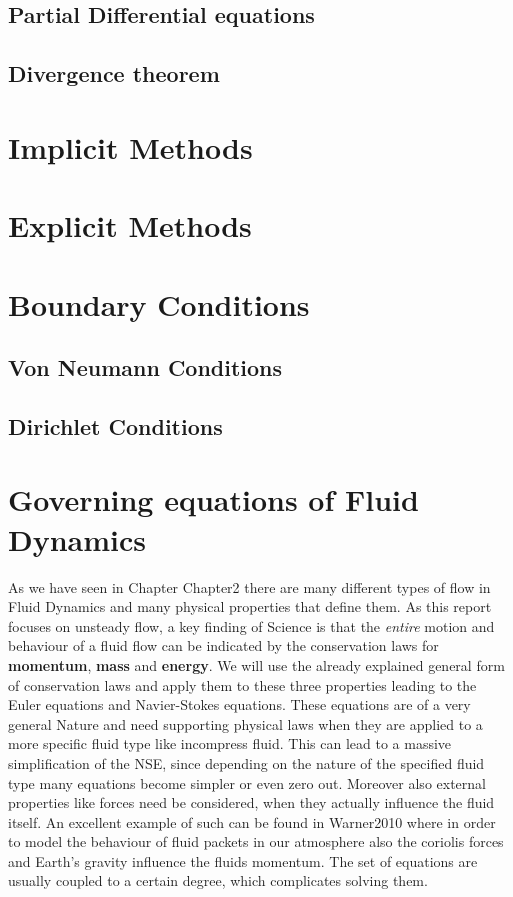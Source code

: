 \subsection{Partial Differential equations}

\subsection{Divergence theorem}
\label{sec:div_theorem}

\section{Implicit Methods}
\section{Explicit Methods}

\section{Boundary Conditions}
\subsection{Von Neumann Conditions}
\subsection{Dirichlet Conditions}

\section{Governing equations of Fluid Dynamics}

As we have seen in Chapter Chapter2 there are many different types of flow in Fluid Dynamics and many physical properties that define them. As this report focuses on unsteady flow, a key finding of Science is that the \emph{entire} motion and behaviour of a fluid flow can be indicated by the conservation laws for \textbf{momentum}, \textbf{mass} and \textbf{energy}. We will use the already explained general form of conservation laws and apply them to these three properties leading to the Euler equations and Navier-Stokes equations. These equations are of a very general Nature and need supporting physical laws when they are applied to a more specific fluid type like incompress fluid. This can lead to a massive simplification of the NSE, since depending on the nature of the specified fluid type many equations become simpler or even zero out. Moreover also external properties like forces need be considered, when they actually influence the fluid itself. An excellent example of such can be found in Warner2010 where in order to model the behaviour of fluid packets in our atmosphere also the coriolis forces and Earth's gravity influence the fluids momentum. The set of equations are usually coupled to a certain degree, which complicates solving them. 

